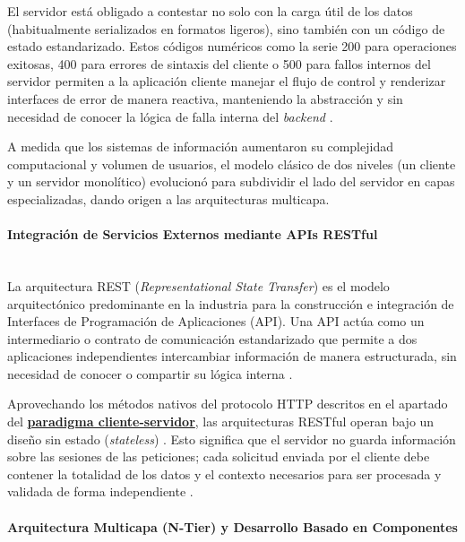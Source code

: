 El servidor está obligado a contestar no solo con la carga útil de los datos (habitualmente serializados en formatos ligeros), sino también con un código de estado estandarizado. Estos códigos numéricos como la serie 200 para operaciones exitosas, 400 para errores de sintaxis del cliente o 500 para fallos internos del servidor permiten a la aplicación cliente manejar el flujo de control y renderizar interfaces de error de manera reactiva, manteniendo la abstracción y sin necesidad de conocer la lógica de falla interna del \emph{backend} \cite{sommerville_se_2015}.

A medida que los sistemas de información aumentaron su complejidad computacional y volumen de usuarios, el modelo clásico de dos niveles (un cliente y un servidor monolítico) evolucionó para subdividir el lado del servidor en capas especializadas, dando origen a las arquitecturas multicapa.

\paragraph{Integración de Servicios Externos mediante APIs RESTful}\leavevmode \\

La arquitectura REST (\textit{Representational State Transfer}) es el modelo arquitectónico predominante en la industria para la construcción e integración de Interfaces de Programación de Aplicaciones (API). Una API actúa como un intermediario o contrato de comunicación estandarizado que permite a dos aplicaciones independientes intercambiar información de manera estructurada, sin necesidad de conocer o compartir su lógica interna \cite{richardson_rest_2007}. 

Aprovechando los métodos nativos del protocolo HTTP descritos en el apartado del \textbf{\hyperlink{target:cliente-servidor}{paradigma cliente-servidor}}, las arquitecturas RESTful operan bajo un diseño sin estado (\textit{stateless}) \cite{richardson_rest_2007}. Esto significa que el servidor no guarda información sobre las sesiones de las peticiones; cada solicitud enviada por el cliente debe contener la totalidad de los datos y el contexto necesarios para ser procesada y validada de forma independiente \cite{richardson_rest_2007}. 


\paragraph{Arquitectura Multicapa (N-Tier) y Desarrollo Basado en Componentes} \leavevmode \\

